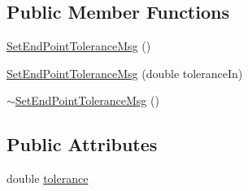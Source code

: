 \subsection*{Public Member Functions}
\begin{DoxyCompactItemize}
\item 
\hyperlink{class_set_end_point_tolerance_msg_aac99231f6e3cceb539c95d46c646c505}{SetEndPointToleranceMsg} ()
\item 
\hyperlink{class_set_end_point_tolerance_msg_adf3eab5a1f2eaf278ec71fdc99a18f2d}{SetEndPointToleranceMsg} (double toleranceIn)
\item 
\hyperlink{class_set_end_point_tolerance_msg_a144d9657d981ea59a037759e2dd9bc64}{$\sim$SetEndPointToleranceMsg} ()
\end{DoxyCompactItemize}
\subsection*{Public Attributes}
\begin{DoxyCompactItemize}
\item 
double \hyperlink{class_set_end_point_tolerance_msg_ae9f1ed5d2407afeea31a428eba055db8}{tolerance}
\end{DoxyCompactItemize}


